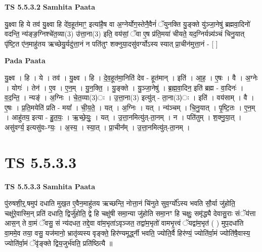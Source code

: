 \documentclass[17pt]{extarticle}
\begin{document}
\textbf{TS 5.5.3.2 } \newline
\textbf{Samhita Paata} \newline

यु॒क्ष्वा हि ये तव॑ यु॒क्ष्वा हि दे॑व॒हूत॑माꣳ॒॒ इत्या॑है॒ष वा अ॒ग्नेर्योग॒स्तेनै॒वैनं॑ ॅयुनक्ति यु॒ङ्क्ते यु॑ञ्जा॒नेषु॑ ब्रह्मवा॒दिनो॑ वदन्ति॒ न्य॑ङ्ङ॒ग्निश्चे॑त॒व्या(3) उ॑त्ता॒ना(3) इति॒ वय॑सां॒ ॅवा ए॒ष प्र॑ति॒मया॑ चीयते॒ यद॒ग्निर्यन्न्य॑ञ्चं चिनु॒यात् पृ॑ष्टि॒त ए॑न॒माहु॑तय ऋच्छेयु॒र्यदु॑त्ता॒नं न पति॑तुꣳ शक्नुया॒दसु॑वर्ग्योऽस्य स्यात् प्रा॒चीन॑मुत्ता॒नं - [  ] \newline

\textbf{Pada Paata} \newline

यु॒क्ष्व । हि । ये । तव॑ । यु॒क्ष्व । हि । दे॒व॒हूत॑मा॒निति॑ देव - हूत॑मान् । इति॑ । आ॒ह॒ । ए॒षः । वै । अ॒ग्नेः । योगः॑ । तेन॑ । ए॒व । ए॒न॒म् । यु॒न॒क्ति॒ । यु॒ङ्क्ते । यु॒ञ्जा॒नेषु॑ । ब्र॒ह्म॒वा॒दिन॒ इति॑ ब्रह्म - वा॒दिनः॑ । व॒द॒न्ति॒ । न्यङ्॑ । अ॒ग्निः । चे॒त॒व्या(3)ः । उ॒त्ता॒ना(3) इत्यु॑त् - ता॒ना(3)ः । इति॑ । वय॑साम् । वै । ए॒षः । प्र॒ति॒मयेति॑ प्रति - मया᳚ । ची॒य॒ते॒ । यत् । अ॒ग्निः । यत् । न्य॑ञ्चम् । चि॒नु॒यात् । पृ॒ष्टि॒तः । ए॒न॒म् । आहु॑तय॒ इत्या - हु॒त॒यः॒ । ऋ॒च्छे॒युः॒ । यत् । उ॒त्ता॒नमित्यु॑त्-ता॒नम् । न । पति॑तुम् । श॒क्नु॒या॒त् । असु॑वर्ग्य॒ इत्यसु॑वः-ग्यः॒ । अ॒स्य॒ । स्या॒त् । प्रा॒चीन᳚म् । उ॒त्ता॒नमित्यु॑त्-ता॒नम् ।  \newline





\section{ TS 5.5.3.3 }

\textbf{TS 5.5.3.3 } \newline
\textbf{Samhita Paata} \newline

पु॑रुषशी॒र्॒.षमुप॑ दधाति मुख॒त ए॒वैन॒माहु॑तय ऋच्छन्ति॒ नोत्ता॒नं चि॑नुते सुव॒र्ग्यो᳚ऽस्य भवति सौ॒र्या जु॑होति॒ चक्षु॑रे॒वास्मि॒न् प्रति॑ दधाति॒ द्विर्जु॑होति॒ द्वे हि चक्षु॑षी समा॒न्या जु॑होति समा॒नꣳ हि चक्षुः॒ समृ॑द्ध्यै देवासु॒राः संॅय॑त्ता आस॒न् ते वा॒मं ॅवसु॒ सं न्य॑दधत॒ तद्दे॒वा वा॑म॒भृता॑ऽवृञ्जत॒ तद्वा॑म॒भृतो॑ वामभृ॒त्त्वं ॅयद्वा॑म॒भृत॑ ( ) मुप॒दधा॑ति वा॒ममे॒व तया॒ वसु॒ यज॑मानो॒ भ्रातृ॑व्यस्य वृङ्क्ते॒ हिर॑ण्यमूर्द्ध्नी भवति॒ ज्योति॒र्वै हिर॑ण्यं॒ ज्योति॑र्वा॒मं ज्योति॑षै॒वास्य॒ ज्योति॑र्वा॒मं ॅवृ॑ङ्क्ते द्विय॒जुर्भ॑वति॒ प्रति॑ष्ठित्यै ॥ \newline
\end{document}
